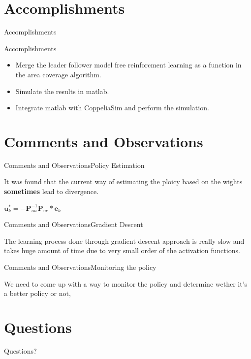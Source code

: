 \documentclass{beamer}
\begin{document}
\section{Accomplishments}
\begin{frame}{Accomplishments}
\begin{block}{Accomplishments}
\begin{itemize}
\item Merge the leader follower model free reinforcment learning as a function in the area coverage algorithm.
\item Simulate the results in matlab.
\item Integrate matlab with CoppeliaSim and perform the simulation.  
\end{itemize}
\end{block}
\end{frame}
\section{Comments and Observations}
\begin{frame}{Comments and Observations}{Policy Estimation}
\begin{block}{}
It was found that the current way of estimating the ploicy based on the wights \textbf{sometimes} lead to divergence. 
\\
\begin{center}
$
\mathbf{u}_k^*  = - \mathbf{P}_{uu}^{-1}\mathbf{P}_{ue}*\mathbf{e}_k
$
\end{center}
\end{block}

\end{frame}
\begin{frame}{Comments and Observations}{Gradient Descent}
\begin{block}{}
The learning process done through gradient descent approach is really slow and takes huge amount of time due to very small order of the activation functions.
\\

\end{block}
\end{frame}
\begin{frame}{Comments and Observations}{Monitoring the policy}
\begin{block}{}
We need to come up with a way to monitor the policy and determine wether it's a better policy or not, 

\end{block}

\end{frame}
\section*{Questions}
\begin{frame}
\begin{LARGE}
\begin{center}
Questions?
\end{center}
\end{LARGE}
\end{frame}
\end{document}
